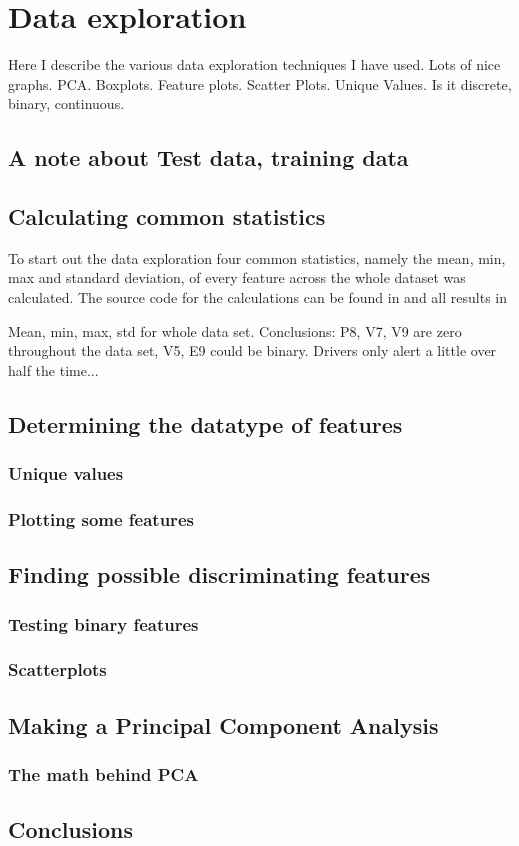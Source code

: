 \chapter{Data exploration}
Here I describe the various data exploration techniques I have used. Lots of nice graphs. PCA. Boxplots. Feature plots. Scatter Plots. Unique Values. Is it discrete, binary, continuous.

\section{A note about Test data, training data}

\section{Calculating common statistics}
To start out the data exploration four common statistics, namely the mean, min, max and standard deviation, of every feature across the whole dataset was calculated. The source code for the calculations can be found in  and all results in 

\par\par
Mean, min, max, std for whole data set. Conclusions: P8, V7, V9 are zero throughout the data set, V5, E9 could be binary. Drivers only alert a little over half the time...

\section{Determining the datatype of features}
\subsection{Unique values}
\subsection{Plotting some features}

\section{Finding possible discriminating features}
\subsection{Testing binary features}
\subsection{Scatterplots}

\section{Making a Principal Component Analysis}
\subsection{The math behind PCA}

\section{Conclusions}
